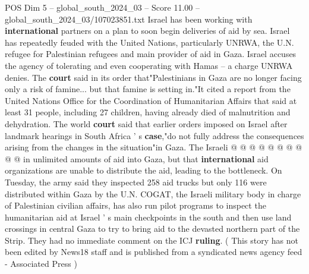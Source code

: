 \begin{textsample}{POS Dim 5 – global\_south\_2024\_03 – Score 11.00 – global\_south\_2024\_03/107023851.txt}
Israel has been working with \textbf{international} partners on a plan to soon begin deliveries of aid by sea.
Israel has repeatedly feuded with the United Nations, particularly UNRWA, the U.N. refugee for Palestinian refugees and main provider of aid in Gaza.
Israel accuses the agency of tolerating and even cooperating with Hamas -- a charge UNRWA denies.
The \textbf{court} said in its order that"Palestinians in Gaza are no longer facing only a risk of famine... but that famine is setting in."It cited a report from the United Nations Office for the Coordination of Humanitarian Affairs that said at least 31 people, including 27 children, having already died of malnutrition and dehydration.
The world \textbf{court} said that earlier orders imposed on Israel after landmark hearings in South Africa ' s \textbf{case},"do not fully address the consequences arising from the changes in the situation"in Gaza.
The Israeli @ @ @ @ @ @ @ @ @ @ in unlimited amounts of aid into Gaza, but that \textbf{international} aid organizations are unable to distribute the aid, leading to the bottleneck.
On Tuesday, the army said they inspected 258 aid trucks but only 116 were distributed within Gaza by the U.N.
COGAT, the Israeli military body in charge of Palestinian civilian affairs, has also run pilot programs to inspect the humanitarian aid at Israel ' s main checkpoints in the south and then use land crossings in central Gaza to try to bring aid to the devasted northern part of the Strip.
They had no immediate comment on the ICJ \textbf{ruling}. ( This story has not been edited by News18 staff and is published from a syndicated news agency feed - Associated Press )

\end{textsample}
